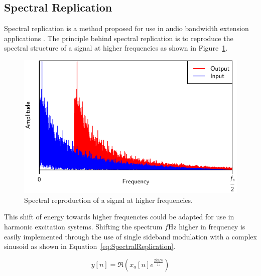 	\subsection{Spectral Replication}
	\label{sec:Excitation-Methods-SpectralReplication}
		Spectral replication is a method proposed for use in audio bandwidth extension applications
		\citep{nagel2010a}. The principle behind spectral replication is to reproduce the spectral structure of a
		signal at higher frequencies as shown in Figure~\ref{fig:SpectralReplication}.

		\begin{figure}[h!]
			\centering
			\includegraphics{chapter3/Images/SpectralReplicationSpectrum.pdf}
			\caption{Spectral reproduction of a signal at higher frequencies.}
			\label{fig:SpectralReplication}
		\end{figure}

		This shift of energy towards higher frequencies could be adapted for use in harmonic excitation systems.
		Shifting the spectrum $f$Hz higher in frequency is easily implemented through the use of single sideband
		modulation with a complex sinusoid as shown in Equation~\ref{eq:SpectralReplication}.

		\begin{equation}
			y[n] = \Re \left( x_{a}[n] e^{\frac{2i\pi fn}{f_{s}}} \right)
			\label{eq:SpectralReplication}
		\end{equation}

